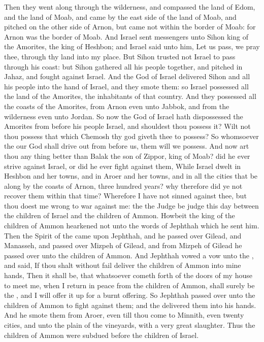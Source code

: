 \begin{biblechapter}
\verse Then they went along through the wilderness, and compassed the land of Edom, and the land of Moab, and came by the east side of the land of Moab, and pitched on the other side of Arnon, but came not within the border of Moab: for Arnon was the border of Moab.
\verse And Israel sent messengers unto Sihon king of the Amorites, the king of Heshbon; and Israel said unto him, Let us pass, we pray thee, through thy land into my place.
\verse But Sihon trusted not Israel to pass through his coast: but Sihon gathered all his people together, and pitched in Jahaz, and fought against Israel.
\verse And the \LORD God of Israel delivered Sihon and all his people into the hand of Israel, and they smote them: so Israel possessed all the land of the Amorites, the inhabitants of that country.
\verse And they possessed all the coasts of the Amorites, from Arnon even unto Jabbok, and from the wilderness even unto Jordan.
\verse So now the \LORD God of Israel hath dispossessed the Amorites from before his people Israel, and shouldest thou possess it?
\verse Wilt not thou possess that which Chemosh thy god giveth thee to possess? So whomsoever the \LORD our God shall drive out from before us, them will we possess.
\verse And now art thou any thing better than Balak the son of Zippor, king of Moab? did he ever strive against Israel, or did he ever fight against them,
\verse While Israel dwelt in Heshbon and her towns, and in Aroer and her towns, and in all the cities that be along by the coasts of Arnon, three hundred years? why therefore did ye not recover them within that time?
\verse Wherefore I have not sinned against thee, but thou doest me wrong to war against me: the \LORD the Judge be judge this day between the children of Israel and the children of Ammon.
\verse Howbeit the king of the children of Ammon hearkened not unto the words of Jephthah which he sent him.
\verse Then the Spirit of the \LORD came upon Jephthah, and he passed over Gilead, and Manasseh, and passed over Mizpeh of Gilead, and from Mizpeh of Gilead he passed over unto the children of Ammon.
\verse And Jephthah vowed a vow unto the \LORD, and said, If thou shalt without fail deliver the children of Ammon into mine hands,
\verse Then it shall be, that whatsoever cometh forth of the doors of my house to meet me, when I return in peace from the children of Ammon, shall surely be the \LORDs, and I will offer it up for a burnt offering.
\verse So Jephthah passed over unto the children of Ammon to fight against them; and the \LORD delivered them into his hands.
\verse And he smote them from Aroer, even till thou come to Minnith, even twenty cities, and unto the plain of the vineyards, with a very great slaughter. Thus the children of Ammon were subdued before the children of Israel.

\end{biblechapter}
